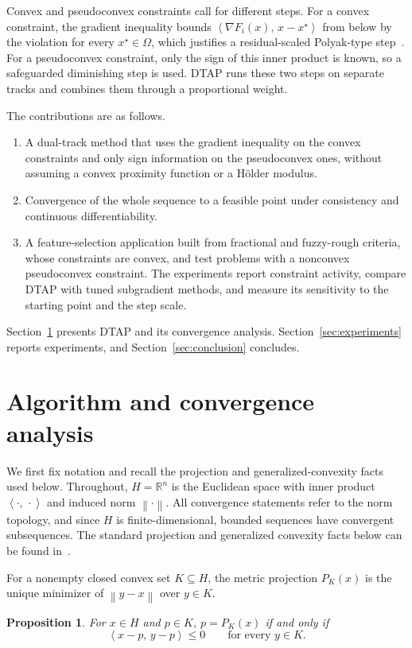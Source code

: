 \documentclass[]{interact}
\theoremstyle{plain}
\newtheorem{proposition}[theorem]{Proposition}
\theoremstyle{definition}
\theoremstyle{remark}
\newcommand{\R}{\mathbb{R}}
\newcommand{\norm}[1]{\left\lVert #1 \right\rVert}
\newcommand{\inner}[2]{\left\langle #1,\, #2 \right\rangle}
\newcommand{\dtap}{\textsc{DTAP}}
\begin{document}
Convex and pseudoconvex constraints call for different steps. For a convex constraint, the gradient inequality bounds $\inner{\nabla F_i(x)}{x-x^\star}$ from below by the violation for every $x^\star\in\Omega$, which justifies a residual-scaled Polyak-type step~\citep{polyak1969,lopez2012}. For a pseudoconvex constraint, only the sign of this inner product is known, so a safeguarded diminishing step is used. DTAP runs these two steps on separate tracks and combines them through a proportional weight.

The contributions are as follows.
\begin{enumerate}[label=\textbf{C\arabic*.},leftmargin=2.4em,itemsep=3pt]
\item A dual-track method that uses the gradient inequality on the convex constraints and only sign information on the pseudoconvex ones, without assuming a convex proximity function or a H\"older modulus.
\item Convergence of the whole sequence to a feasible point under consistency and continuous differentiability.
\item A feature-selection application built from fractional and fuzzy-rough criteria, whose constraints are convex, and test problems with a nonconvex pseudoconvex constraint. The experiments report constraint activity, compare DTAP with tuned subgradient methods, and measure its sensitivity to the starting point and the step scale.
\end{enumerate}

Section~\ref{sec:convergence} presents \dtap{} and its convergence analysis. Section~\ref{sec:experiments} reports experiments, and Section~\ref{sec:conclusion} concludes.


\section{Algorithm and convergence analysis}\label{sec:convergence}
We first fix notation and recall the projection and generalized-convexity facts used below.
Throughout, $H=\R^n$ is the Euclidean space with inner product $\inner{\cdot}{\cdot}$ and induced norm $\norm{\cdot}$. All convergence statements refer to the norm topology, and since $H$ is finite-dimensional, bounded sequences have convergent subsequences. The standard projection and generalized convexity facts below can be found in~\citep{bauschke2011,mangasarian1994}.

For a nonempty closed convex set $K\subseteq H$, the metric projection $P_K(x)$ is the unique minimizer of $\norm{y-x}$ over $y\in K$.
\begin{proposition}\label{prop:proj-char}
For $x\in H$ and $p\in K$, $p=P_K(x)$ if and only if
\begin{equation}\label{eq:proj-char}
\inner{x-p}{y-p}\le0\qquad\text{for every }y\in K.
\end{equation}
\end{proposition}
\end{document}
